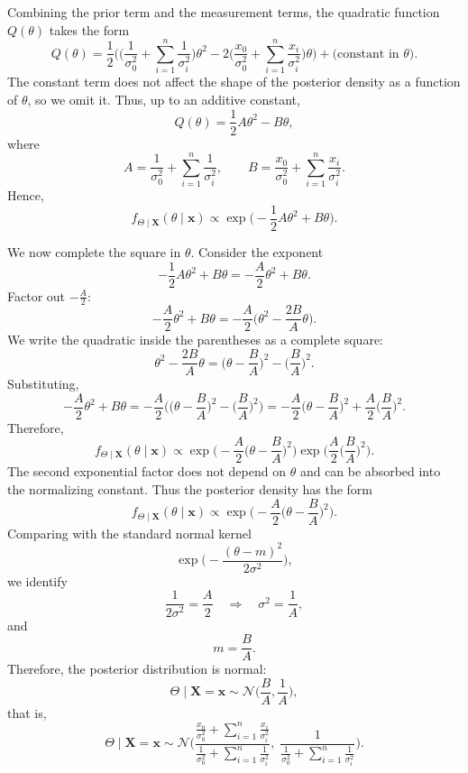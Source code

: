 Combining the prior term and the measurement terms, the quadratic function \(Q(\theta)\) takes the form
\[
Q(\theta)
=
\frac{1}{2}\Bigg(
\Big(\frac{1}{\sigma_{0}^{2}} + \sum_{i=1}^{n}\frac{1}{\sigma_{i}^{2}}\Big)\theta^{2}
-
2\Big(\frac{x_0}{\sigma_{0}^{2}} + \sum_{i=1}^{n}\frac{x_i}{\sigma_{i}^{2}}\Big)\theta
\Big)
+
\text{(constant in \(\theta\))}.
\]
The constant term does not affect the shape of the posterior density as a function of \(\theta\), so we omit it.  
Thus, up to an additive constant,
\[
Q(\theta)
=
\frac{1}{2}A\theta^{2} - B\theta,
\]
where
\[
A
=
\frac{1}{\sigma_{0}^{2}} + \sum_{i=1}^{n}\frac{1}{\sigma_{i}^{2}},
\qquad
B
=
\frac{x_0}{\sigma_{0}^{2}} + \sum_{i=1}^{n}\frac{x_i}{\sigma_{i}^{2}}.
\]
Hence,
\[
f_{\Theta\mid \mathbf{X}}(\theta\mid \mathbf{x})
\propto
\exp\Big(-\frac{1}{2}A\theta^{2} + B\theta\Big).
\]

We now complete the square in \(\theta\).  
Consider the exponent
\[
-\frac{1}{2}A\theta^{2} + B\theta
=
-\frac{A}{2}\theta^{2} + B\theta.
\]
Factor out \(-\frac{A}{2}\):
\[
-\frac{A}{2}\theta^{2} + B\theta
=
-\frac{A}{2}\Big(\theta^{2} - \frac{2B}{A}\theta\Big).
\]
We write the quadratic inside the parentheses as a complete square:
\[
\theta^{2} - \frac{2B}{A}\theta
=
\Big(\theta - \frac{B}{A}\Big)^{2}
-
\Big(\frac{B}{A}\Big)^{2}.
\]
Substituting,
\[
-\frac{A}{2}\theta^{2} + B\theta
=
-\frac{A}{2}\Big(\Big(\theta - \frac{B}{A}\Big)^{2} - \Big(\frac{B}{A}\Big)^{2}\Big)
=
-\frac{A}{2}\Big(\theta - \frac{B}{A}\Big)^{2}
+
\frac{A}{2}\Big(\frac{B}{A}\Big)^{2}.
\]
Therefore,
\[
f_{\Theta\mid \mathbf{X}}(\theta\mid \mathbf{x})
\propto
\exp\Big(-\frac{A}{2}\Big(\theta - \frac{B}{A}\Big)^{2}\Big)
\exp\Big(\frac{A}{2}\Big(\frac{B}{A}\Big)^{2}\Big).
\]
The second exponential factor does not depend on \(\theta\) and can be absorbed into the normalizing constant.  
Thus the posterior density has the form
\[
f_{\Theta\mid \mathbf{X}}(\theta\mid \mathbf{x})
\propto
\exp\Big(-\frac{A}{2}\Big(\theta - \frac{B}{A}\Big)^{2}\Big).
\]
Comparing with the standard normal kernel
\[
\exp\Big(-\frac{(\theta - m)^{2}}{2\sigma^{2}}\Big),
\]
we identify
\[
\frac{1}{2\sigma^{2}}
=
\frac{A}{2}
\quad\Rightarrow\quad
\sigma^{2}
=
\frac{1}{A},
\]
and
\[
m
=
\frac{B}{A}.
\]
Therefore, the posterior distribution is normal:
\[
\Theta \mid \mathbf{X} = \mathbf{x}
\sim
\mathcal{N}\Big(\frac{B}{A}, \frac{1}{A}\Big),
\]
that is,
\[
\Theta \mid \mathbf{X} = \mathbf{x}
\sim
\mathcal{N}\Bigg(
\frac{\displaystyle \frac{x_0}{\sigma_{0}^{2}} + \sum_{i=1}^{n}\frac{x_i}{\sigma_{i}^{2}}}{\displaystyle \frac{1}{\sigma_{0}^{2}} + \sum_{i=1}^{n}\frac{1}{\sigma_{i}^{2}}},
\;
\frac{1}{\displaystyle \frac{1}{\sigma_{0}^{2}} + \sum_{i=1}^{n}\frac{1}{\sigma_{i}^{2}}}
\Bigg).
\]

